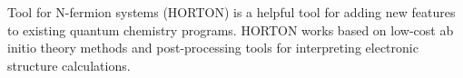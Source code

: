 Tool for N-fermion systems (HORTON) is a helpful tool for adding new features to existing quantum chemistry programs. HORTON works based on low-cost ab initio theory methods and post-processing tools for interpreting electronic structure calculations.